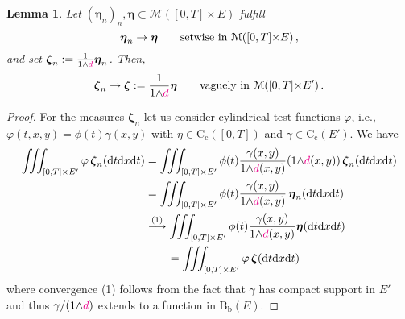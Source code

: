\documentclass[11pt,reqno]{amsart}
\numberwithin{equation}{section}
\newcommand{\calM}{\mathcal{M}}
\newcommand{\dd}{\mathrm{d}}
\newtheorem{lemma}[theorem]{Lemma}
\theoremstyle{definition}
\def\dd{\mathrm{d}}
\newcommand{\Cc}{\mathrm{C}_{\mathrm{c}}}
\newcommand{\Bb}{\mathrm{B}_{\mathrm b}}
\newcommand{\Ed}{{E'}}
\newcommand{\zzeta}{\boldsymbol \zeta}
\newcommand{\eeta}{\boldsymbol \eta}
\newcommand{\RNEW}{\color{black}} %
\newcommand{\TODO}[1]{\todo[inline, color=cyan!20]{#1}}
\newcommand{\EEE}{\color{black}}
\newcommand{\dpi}{{\color{magenta} d}}
\numberwithin{equation}{section}
\begin{document}
\begin{lemma}
\label{l:obvious-useful}
Let $(\eeta_n)_n,\eeta \subset   \calM([0,T]{\times}E)$ fulfill
\[
\eeta_n \to \eeta \qquad \text{setwise in }  \RNEW \calM([0,T]{\times}E)\,, \RNEW
\]
and set $\zzeta_n: =  \frac1{1{\wedge}\dpi} \eeta_n$.
 Then,
\[
\zzeta_n \to \zzeta  :=\frac1{1{\wedge}\dpi} \eeta  \qquad \text{vaguely in }  \calM([0,T]{\times}E')\,.
\]
\end{lemma}
\begin{proof}
For the measures $\zzeta_n$
 let us consider cylindrical  test functions $\varphi$, i.e.,
  $\varphi(t,x,y) = \phi(t) \gamma(x,y)$ with  $\eta\in \Cc([0,T])$ and $\gamma \in \Cc(E')$.
 We have
\[
\begin{aligned}
\iiint_{[0,T]{\times}\Ed} \varphi\, \zzeta_n(\dd t \dd x \dd t ) &  = 
\iiint_{[0,T]{\times}\Ed} \phi(t)  \frac{\gamma(x,y)}{1{\wedge}\dpi(x,y)} (1{\wedge}\dpi(x,y)) \,  \zzeta_n(\dd t \dd x \dd t )
\\
& = \iiint_{[0,T]{\times}\Ed} \phi(t)  \frac{\gamma(x,y)}{1{\wedge}\dpi(x,y)}\, \eeta_n (\dd t \dd x \dd t )
\\
& \stackrel{(1)}{\longrightarrow}
\iiint_{[0,T]{\times}\Ed} \phi(t)  \frac{\gamma(x,y)}{1{\wedge}\dpi(x,y)} \eeta(\dd t \dd x \dd t )
\\
& \qquad = \iiint_{[0,T]{\times}\Ed} \varphi\,  \zzeta(\dd t \dd x \dd t ) 
\end{aligned}
\]
where  convergence 
{\footnotesize (1)} follows from the fact that $\gamma$ has compact support in $\Ed$ and thus 
 $\gamma/(1{\wedge}\dpi) $ extends to a function in $ \Bb(E)$. 
\end{proof}
\EEE
\end{document}

